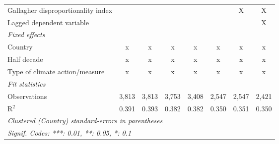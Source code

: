 \begin{tabular}{lccccccc}
   Gallagher disproportionality index                                &                &               &              &             &         & X       & X\\  
   Lagged dependent variable                                         &                &               &              &             &         &         & X\\  
   \emph{Fixed effects}\\
   Country                                                           & x              & x             & x            & x           & x       & x       & x\\  
   Half decade                                                       & x              & x             & x            & x           & x       & x       & x\\  
   Type of climate action/measure                                    & x              & x             & x            & x           & x       & x       & x\\  
   \midrule \emph{Fit statistics}\\
   Observations                                                      & 3,813          & 3,813         & 3,753        & 3,408       & 2,547   & 2,547   & 2,421\\  
   R$^2$                                                             & 0.391          & 0.393         & 0.382        & 0.382       & 0.350   & 0.351   & 0.350\\  
   \midrule
   \multicolumn{8}{l}{\emph{Clustered (Country) standard-errors in parentheses}}\\
   \multicolumn{8}{l}{\emph{Signif. Codes: ***: 0.01, **: 0.05, *: 0.1}}\\
\end{tabular}
\par\endgroup


